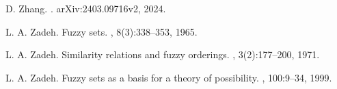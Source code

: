\documentclass[preprint,3p,times]{elsarticle}
\theoremstyle{plain}
\theoremstyle{definition}
\numberwithin{equation}{section}
\begin{document}
\begin{thebibliography}{}
D. Zhang.
.
\newblock arXiv:2403.09716v2, 2024.

L. A. Zadeh.
\newblock Fuzzy sets.
, 8(3):338--353, 1965.

L. A. Zadeh.
\newblock Similarity relations and fuzzy orderings.
, 3(2):177--200, 1971.

L. A. Zadeh.
\newblock Fuzzy sets as a basis for a theory of possibility.
, 100:9--34, 1999.

\end{thebibliography}
\end{document}
